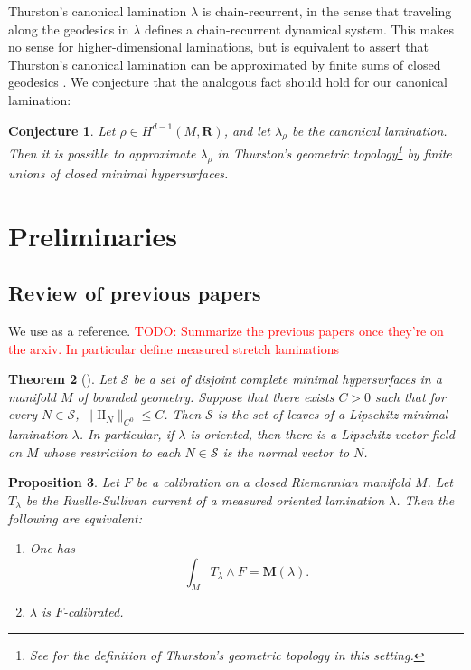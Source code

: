 \documentclass[reqno,11pt]{amsart}
\newcommand{\RR}{\mathbf{R}}
\newcommand{\Two}{\mathrm{I\!I}}
\newcommand{\Mass}{\mathbf M}
\newtheorem{theorem}{Theorem}[section]
\newtheorem{proposition}[theorem]{Proposition}
\newtheorem{conjecture}[theorem]{Conjecture}
\theoremstyle{definition}
\numberwithin{equation}{section}
\newcommand\todo[1]{\textcolor{red}{TODO: #1}}
\begin{document}
Thurston's canonical lamination $\lambda$ is chain-recurrent, in the sense that traveling along the geodesics in $\lambda$ defines a chain-recurrent dynamical system.
This makes no sense for higher-dimensional laminations, but is equivalent to assert that Thurston's canonical lamination can be approximated by finite sums of closed geodesics \cite[\S9]{Gu_ritaud_2017}.
We conjecture that the analogous fact should hold for our canonical lamination:

\begin{conjecture}\label{chain recurrence}
Let $\rho \in H^{d - 1}(M, \RR)$, and let $\lambda_\rho$ be the canonical lamination.
Then it is possible to approximate $\lambda_\rho$ in Thurston's geometric topology\footnote{See \cite[\S1]{BackusCML} for the definition of Thurston's geometric topology in this setting.} by finite unions of closed minimal hypersurfaces.
\end{conjecture}


\section{Preliminaries}\label{prevResults}
\subsection{Review of previous papers}
We use \cite{BackusCML, BackusBest1} as a reference.
\todo{Summarize the previous papers once they're on the arxiv. In particular define measured stretch laminations}

\begin{theorem}[{\cite[Theorem A]{BackusCML}}]\label{disjoint surfaces are lamination}
Let $\mathcal S$ be a set of disjoint complete minimal hypersurfaces in a manifold $M$ of bounded geometry.
Suppose that there exists $C > 0$ such that for every $N \in \mathcal S$, $\|\Two_N\|_{C^0} \leq C$.
Then $\mathcal S$ is the set of leaves of a Lipschitz minimal lamination $\lambda$.
In particular, if $\lambda$ is oriented, then there is a Lipschitz vector field on $M$ whose restriction to each $N \in \mathcal S$ is the normal vector to $N$.
\end{theorem}

\begin{proposition}\label{calibration condition}
Let $F$ be a calibration on a closed Riemannian manifold $M$.
Let $T_\lambda$ be the Ruelle-Sullivan current of a measured oriented lamination $\lambda$.
Then the following are equivalent:
\begin{enumerate}
\item One has \begin{equation}\label{calibration by Ruelle Sullivan}
\int_M T_\lambda \wedge F = \Mass(\lambda).
\end{equation}
\item $\lambda$ is $F$-calibrated.
\end{enumerate}
\end{proposition}
\end{document}

